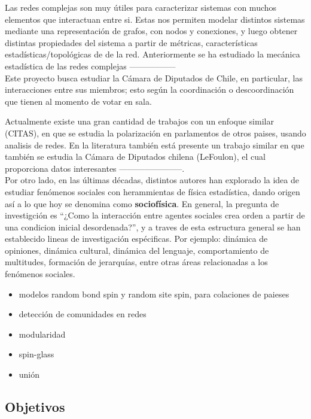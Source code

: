 \documentclass{proyectotesis}
\begin{document}
Las redes complejas son muy útiles para caracterizar sistemas con muchos elementos que interactuan entre si. Estas nos permiten modelar distintos sistemas mediante una representación de grafos, con nodos y conexiones, y luego obtener distintas propiedades del sistema a partir de métricas, características estadísticas/topológicas de
de la red.
Anteriormente se ha estudiado la mecánica estadística de las redes complejas ----------------- \\

Este proyecto busca estudiar la Cámara de Diputados de Chile, en particular, las interacciones entre sus miembros; esto según la coordinación o descoordinación que tienen al momento de votar en sala. 

Actualmente existe una gran cantidad de trabajos con un enfoque similar (CITAS), en que se estudia la polarización en parlamentos de otros paises, usando analisis de redes. En la literatura también está presente un trabajo similar en que también se estudia la Cámara de Diputados chilena (LeFoulon), el cual proporciona datos interesantes -----------------------. \\

Por otro lado, en las últimas décadas, distintos autores han explorado la idea de estudiar fenómenos sociales con herammientas de física estadística, dando origen así a lo que hoy se denomina como \textbf{sociofísica}. En general, la pregunta de investigción es ``¿Como la interacción entre agentes sociales crea orden a partir de una condicion inicial desordenada?'', y a traves de esta estructura general se han establecido lineas de investigación espécificas. Por ejemplo: dinámica de opiniones, dinámica cultural, dinámica del lenguaje, comportamiento de multitudes, formación de jerarquías, entre otras áreas relacionadas a los fenómenos sociales. 

\begin{itemize}
    \item modelos random bond spin y random site spin, para colaciones de paieses
    \item detección de comunidades en redes
    \item modularidad
    \item spin-glass
    \item unión
\end{itemize}

\subsection{Objetivos}
\end{document}
